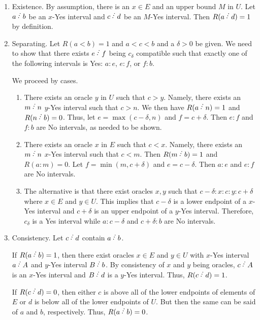 \documentclass[12pt]{article}
\begin{document}
\begin{enumerate}
    \item Existence. By assumption, there is an $x \in E$ and an upper bound $M$ in $U$. Let $a\lte b$ be an $x$-Yes interval and $c\lte d$ be an $M$-Yes interval. Then $R(a\lte d) = 1$ by definition.  


    \item Separating. Let $R(a\lt b)=1$ and $a < c< b$ and a $\delta > 0$ be given. We need to show that there exists $e\lte f$ being $c_\delta$ compatible such that exactly one of the following intervals is Yes: $a:e$, $e:f$, or $f:b$.

    We proceed by cases.
    \begin{enumerate}
    \item There exists an oracle $y$ in $U$ such that $c > y$. Namely, there exists an $m \lte n$ $y$-Yes interval such that $c > n$. We then have $R(a \lte n) = 1$ and $R(n\lte b) = 0$. Thus, let $e = \max(c-\delta, n)$ and $f = c+\delta$. Then $e:f$ and $f:b$ are No intervals, as needed to be shown. 

    \item There exists an oracle $x$ in $E$ such that $c < x$. Namely, there exists an $m \lte n$ $x$-Yes interval such that $c < m$. Then $R(m\lte b) = 1$ and $R(a:m) = 0$. Let $f = \min(m, c+\delta)$ and $e = c-\delta$. Then $a:e$ and $e:f$ are No intervals. 

    \item The alternative is that there exist oracles $x, y$ such that $c-\delta : x: c: y: c+\delta$ where $x \in E$ and $y \in U$. This implies that $c-\delta$ is a lower endpoint of a $x$-Yes interval and $c+\delta$ is an upper endpoint of a $y$-Yes interval. Therefore, $c_\delta$ is a Yes interval while $a:c-\delta$ and $c+\delta:b$ are No intervals. 

     \end{enumerate}

    \item Consistency.  Let $c\lte d$ contain $a\lte b$. 
    
    If $R(a \lte b)=1$, then there exist oracles $x \in E$ and $y \in U$ with $x$-Yes interval $a\lte A$ and $y$-Yes interval $B\lte b$. By consistency of $x$ and $y$ being oracles, $c\lte A$ is an $x$-Yes interval and $B\lte d$ is a $y$-Yes interval. Thus, $R(c\lte d) = 1$.

    If $R(c\lte d) = 0$, then either $c$ is above all of the lower endpoints of elements of $E$ or $d$ is below all of the lower endpoints of $U$. But then the same can be said of $a$ and $b$, respectively. Thus, $R(a\lte b) = 0$.


\end{enumerate}
\end{document}
